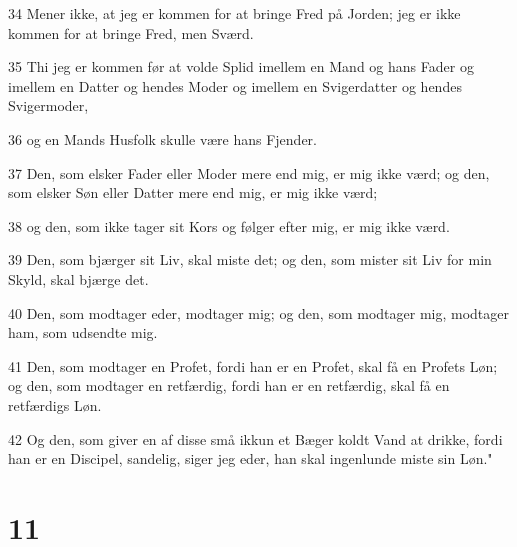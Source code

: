 \par 34 Mener ikke, at jeg er kommen for at bringe Fred på Jorden; jeg er ikke kommen for at bringe Fred, men Sværd.
\par 35 Thi jeg er kommen før at volde Splid imellem en Mand og hans Fader og imellem en Datter og hendes Moder og imellem en Svigerdatter og hendes Svigermoder,
\par 36 og en Mands Husfolk skulle være hans Fjender.
\par 37 Den, som elsker Fader eller Moder mere end mig, er mig ikke værd; og den, som elsker Søn eller Datter mere end mig, er mig ikke værd;
\par 38 og den, som ikke tager sit Kors og følger efter mig, er mig ikke værd.
\par 39 Den, som bjærger sit Liv, skal miste det; og den, som mister sit Liv for min Skyld, skal bjærge det.
\par 40 Den, som modtager eder, modtager mig; og den, som modtager mig, modtager ham, som udsendte mig.
\par 41 Den, som modtager en Profet, fordi han er en Profet, skal få en Profets Løn; og den, som modtager en retfærdig, fordi han er en retfærdig, skal få en retfærdigs Løn.
\par 42 Og den, som giver en af disse små ikkun et Bæger koldt Vand at drikke, fordi han er en Discipel, sandelig, siger jeg eder, han skal ingenlunde miste sin Løn."

\chapter{11}

